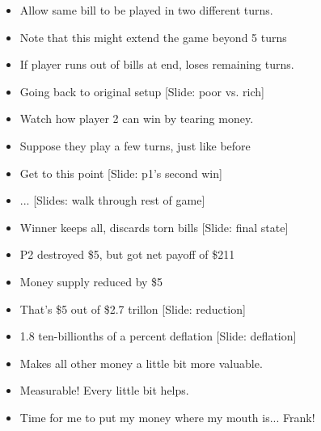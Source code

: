 \documentclass[12pt]{article}
\begin{document}
{\begin{itemize}
\item Allow same bill to be played in two different turns.

\item Note that this might extend the game beyond 5 turns

\item If player runs out of bills at end, loses remaining turns.

\item Going back to original setup [Slide:  poor vs. rich]

\item Watch how player 2 can win by tearing money.

\item Suppose they play a few turns, just like before

\item Get to this point [Slide: p1's second win]

\item ... [Slides:  walk through rest of game]

\item Winner keeps all, discards torn bills [Slide:  final state]

\item P2 destroyed \$5, but got net payoff of \$211

\item Money supply reduced by \$5

\item That's \$5 out of \$2.7 trillon [Slide:  reduction]

\item 1.8 ten-billionths of a percent deflation [Slide:  deflation]

\item Makes all other money a little bit more valuable.

\item Measurable!  Every little bit helps.

\item Time for me to put my money where my mouth is... Frank!






\end{itemize}

}
\end{document}
